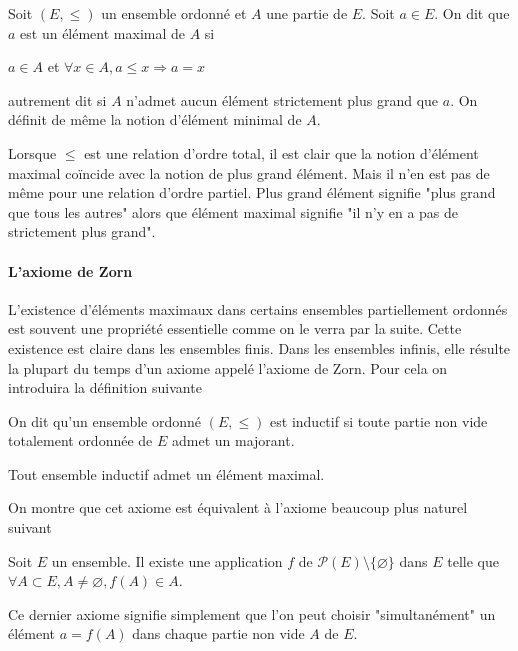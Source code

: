 \begin{de}
Soit $(E,\leqslant)$ un ensemble ordonné et $A$ une partie de $E$.
Soit $a \in E$. On dit que $a$ est un élément maximal de $A$ si

$a \in A$ et $\forall x \in A, a \leqslant x \Rightarrow a = x$

autrement dit si $A$ n'admet aucun élément strictement plus grand que $a$.
On définit de même la notion d'élément minimal de $A$.
\end{de}

\begin{rem}
Lorsque $\leqslant$ est une relation d'ordre total, il est clair
que la notion d'élément maximal coïncide avec la notion de plus grand
élément. Mais il n'en est pas de même pour une relation d'ordre partiel.
Plus grand élément signifie "plus grand que tous les autres" alors que
élément maximal signifie "il n'y en a pas de strictement plus grand".
\end{rem}

\paragraph{L'axiome de Zorn}

L'existence d'éléments maximaux dans certains ensembles partiellement
ordonnés est souvent une propriété essentielle comme on le verra par la
suite. Cette existence est claire dans les ensembles finis. Dans les
ensembles infinis, elle résulte la plupart du temps d'un axiome appelé
l'axiome de Zorn. Pour cela on introduira la définition suivante

\begin{de}
On dit qu'un ensemble ordonné $(E,\leqslant)$ est inductif si
toute partie non vide totalement ordonnée de $E$ admet un majorant.
\end{de}

\begin{thm}[Zorn]
Tout ensemble inductif admet un élément maximal.
\end{thm}

\begin{rem}
On montre que cet axiome est équivalent à l'axiome
beaucoup plus naturel suivant
\end{rem}

\begin{thm}
Soit $E$ un ensemble. Il existe une
application $f$ de $\mathscr{P}(E) \setminus \{\varnothing\}$ dans $E$
telle que $\forall A \subset E, A \neq \varnothing, f(A) \in A$.
\end{thm}

\begin{rem}
Ce dernier axiome signifie simplement que l'on peut
choisir "simultanément" un élément $a = f(A)$ dans chaque partie non
vide $A$ de $E$.
\end{rem}